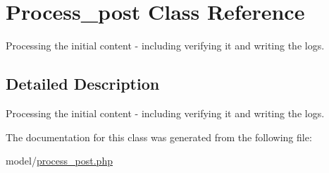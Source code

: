 \hypertarget{classProcess__post}{\section{Process\-\_\-post Class Reference}
\label{classProcess__post}
}


Processing the initial content -\/ including verifying it and writing the logs.  




\subsection{Detailed Description}
Processing the initial content -\/ including verifying it and writing the logs. 

The documentation for this class was generated from the following file\-:\begin{DoxyCompactItemize}
\item 
model/\hyperlink{process__post_8php}{process\-\_\-post.\-php}\end{DoxyCompactItemize}
